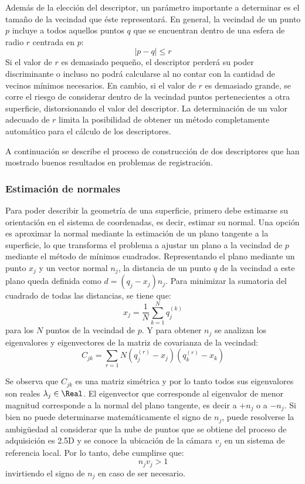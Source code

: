 Además de la elección del descriptor, un parámetro importante a determinar es
el tamaño de la vecindad que éste representará.
En general, la vecindad de un punto $p$ incluye a todos aquellos puntos $q$
que se encuentran dentro de una esfera de radio $r$ centrada en $p$:
\[ |p - q| \leq r \]
Si el valor de $r$ es demasiado pequeño, el descriptor perderá su poder discriminante
o incluso no podrá calcularse al no contar con la cantidad de vecinos mínimos necesarios.
En cambio, si el valor de $r$ es demasiado grande, se corre el riesgo de considerar
dentro de la vecindad puntos pertenecientes a otra superficie, distorsionando el valor del descriptor.
La determinación de un valor adecuado de $r$ limita la posibilidad de obtener un método completamente
automático para el cálculo de los descriptores\cite{RusuDoctoralDissertation}.


A continuación se describe el proceso de construcción de dos descriptores
que han mostrado buenos resultados en problemas de registración\cite{Rusu:2009:FPF:1703435.1703733}.

\subsubsection{Estimación de normales}
Para poder describir la geometría de una superficie,
primero debe estimarse su orientación en el sistema de coordenadas, es decir, estimar su normal.
Una opción es aproximar la normal mediante la estimación de un plano tangente a la superficie,
lo que transforma el problema a ajustar un plano a la vecindad de $p$
mediante el método de mínimos cuadrados. 
Representando el plano mediante un punto $x_j$ y un vector normal $n_j$,
la distancia de un punto $q$ de la vecindad a este plano queda definida como
$d = (q_j - x_j) n_j$.
Para minimizar la sumatoria del cuadrado de todas las distancias, se tiene que:
\[x_j = \frac{1}{N} \sum_{k=1}^{N} q^{(k)}_j \]
para los $N$ puntos de la vecindad de $p$.
Y para obtener $n_j$ se analizan los eigenvalores y eigenvectores de la matriz de covarianza de la vecindad:
\[ C_{jk} = \sum_{r=1}{N} (q^{(r)}_j - x_j) (q^{(r)}_k - x_k) \]

Se observa que $C_{jk}$ es una matriz simétrica y por lo tanto todos sus eigenvalores son reales
$\lambda_j \in \Real$.
El eigenvector que corresponde al eigenvalor de menor magnitud corresponde a la normal del plano tangente,
es decir a $+n_j$ o a $-n_j$\cite{10.1109/34.334391}.
Si bien no puede determinarse matemáticamente el signo de $n_j$,
puede resolverse la ambigüedad al considerar que la nube de puntos que se obtiene del proceso de adquisición
es 2.5D y se conoce la ubicación de la cámara $v_j$ en un sistema de referencia local.
Por lo tanto, debe cumplirse que:
\[n_j v_j > 1\]
invirtiendo el signo de $n_j$ en caso de ser necesario.

